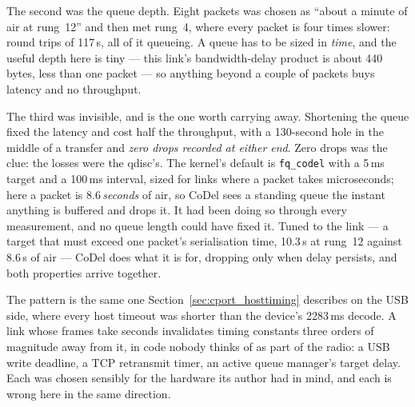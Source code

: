 The second was the queue depth.  Eight packets was chosen as ``about a
minute of air at rung~12'' and then met rung~4, where every packet is
four times slower: round trips of 117\,s, all of it queueing.  A queue
has to be sized in \emph{time}, and the useful depth here is tiny ---
this link's bandwidth-delay product is about 440\,bytes, less than one
packet --- so anything beyond a couple of packets buys latency and no
throughput.

The third was invisible, and is the one worth carrying away.  Shortening
the queue fixed the latency and cost half the throughput, with a
130-second hole in the middle of a transfer and \emph{zero drops
recorded at either end}.  Zero drops was the clue: the losses were the
qdisc's.  The kernel's default is \texttt{fq\_codel} with a 5\,ms
target and a 100\,ms interval, sized for links where a packet takes
microseconds; here a packet is 8.6\,\emph{seconds} of air, so CoDel
sees a standing queue the instant anything is buffered and drops it.
It had been doing so through every measurement, and no queue length
could have fixed it.  Tuned to the link --- a target that must exceed
one packet's serialisation time, 10.3\,s at rung~12 against 8.6\,s of
air --- CoDel does what it is for, dropping only when delay persists,
and both properties arrive together.

The pattern is the same one Section~\ref{sec:cport_hosttiming}
describes on the USB side, where every host timeout was shorter than
the device's 2283\,ms decode.  A link whose frames take seconds
invalidates timing constants three orders of magnitude away from it,
in code nobody thinks of as part of the radio: a USB write deadline, a
TCP retransmit timer, an active queue manager's target delay.  Each was
chosen sensibly for the hardware its author had in mind, and each is
wrong here in the same direction.
